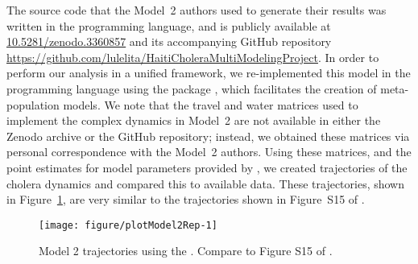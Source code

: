 The source code that the Model~2 authors used to generate their results was written in the  programming language, and is publicly available at \url{10.5281/zenodo.3360857} and its accompanying GitHub repository \url{https://github.com/lulelita/HaitiCholeraMultiModelingProject}.
In order to perform our analysis in a unified framework, we re-implemented this model in the  programming language using the  package \citep{asfaw23arxiv}, which facilitates the creation of meta-population models.
We note that the travel and water matrices used to implement the complex dynamics in Model~2 \citep{lee20sup} are not available in either the Zenodo archive or the GitHub repository;
instead, we obtained these matrices via personal correspondence with the Model~2 authors.
Using these matrices, and the point estimates for model parameters provided by \citep{lee20sup}, we created trajectories of the cholera dynamics and compared this to available data.
These trajectories, shown in Figure~\ref{fig:mod2rep}, are very similar to the trajectories shown in Figure~S15 of \cite{lee20sup}.




\begin{figure}[!h]
\begin{knitrout}
\color{fgcolor}\begin{kframe}


{\ttfamily\noindent\color{warningcolor}{Warning: Using `size` aesthetic for lines was deprecated in ggplot2 3.4.0.\\i Please use `linewidth` instead.\\This warning is displayed once every 8 hours.\\Call `lifecycle::last\_lifecycle\_warnings()` to see where this warning was\\generated.}}\end{kframe}

{\centering \texttt{[image: figure/plotModel2Rep-1]} 

}


\end{knitrout}
\caption{\label{fig:mod2rep}
Model 2 trajectories using the . Compare to Figure S15 of \cite{lee20sup}.
}
\end{figure}

